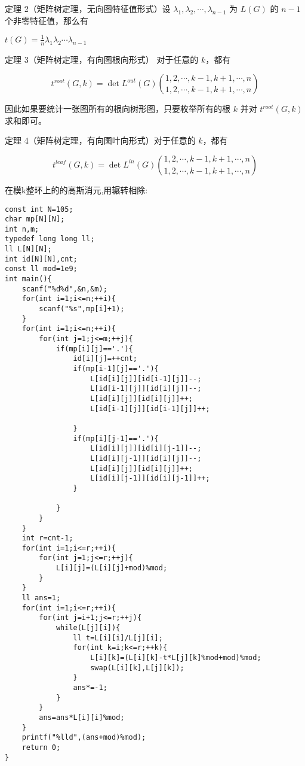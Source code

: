 \documentclass[UTF8]{ctexart}
\begin{document}
定理 2（矩阵树定理，无向图特征值形式）设 $\lambda_1, \lambda_2, \cdots, \lambda_{n-1}$ 为 $L(G)$ 的 $n - 1$ 个非零特征值，那么有

$t(G) = \frac{1}{n}\lambda_1\lambda_2\cdots\lambda_{n-1}$

定理 3（矩阵树定理，有向图根向形式） 对于任意的 $k$，都有

$$
t^{root}(G,k) = \det L^{out}(G)\binom{1,2,\cdots,k-1,k+1,\cdots,n}{1,2,\cdots,k-1,k+1,\cdots,n}
$$

因此如果要统计一张图所有的根向树形图，只要枚举所有的根 $k$ 并对 $t^{root}(G,k)$ 求和即可。

定理 4（矩阵树定理，有向图叶向形式）对于任意的 $k$，都有

$$
t^{leaf}(G,k) = \det L^{in}(G)\binom{1,2,\cdots,k-1,k+1,\cdots,n}{1,2,\cdots,k-1,k+1,\cdots,n}
$$


在模k整环上的的高斯消元,用辗转相除:

\begin{lstlisting} 
const int N=105;
char mp[N][N];
int n,m;
typedef long long ll;
ll L[N][N];
int id[N][N],cnt;
const ll mod=1e9;
int main(){
    scanf("%d%d",&n,&m);
    for(int i=1;i<=n;++i){
        scanf("%s",mp[i]+1);
    }
    for(int i=1;i<=n;++i){
        for(int j=1;j<=m;++j){
            if(mp[i][j]=='.'){
                id[i][j]=++cnt;
                if(mp[i-1][j]=='.'){
                    L[id[i][j]][id[i-1][j]]--;
                    L[id[i-1][j]][id[i][j]]--;
                    L[id[i][j]][id[i][j]]++;
                    L[id[i-1][j]][id[i-1][j]]++;
                    
                }
                if(mp[i][j-1]=='.'){
                    L[id[i][j]][id[i][j-1]]--;
                    L[id[i][j-1]][id[i][j]]--;
                    L[id[i][j]][id[i][j]]++;
                    L[id[i][j-1]][id[i][j-1]]++;
                }
                
            }
        }
    }
    int r=cnt-1;
    for(int i=1;i<=r;++i){
        for(int j=1;j<=r;++j){
            L[i][j]=(L[i][j]+mod)%mod;
        }
    }
    ll ans=1;
    for(int i=1;i<=r;++i){
        for(int j=i+1;j<=r;++j){
            while(L[j][i]){
                ll t=L[i][i]/L[j][i];
                for(int k=i;k<=r;++k){
                    L[i][k]=(L[i][k]-t*L[j][k]%mod+mod)%mod;
                    swap(L[i][k],L[j][k]);
                }
                ans*=-1;
            }
        }
        ans=ans*L[i][i]%mod;
    }
    printf("%lld",(ans+mod)%mod);
    return 0;
}    
\end{lstlisting}
\end{document}
